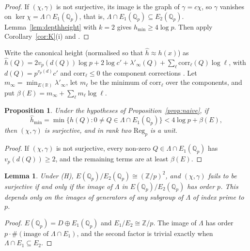 \documentclass[11pt,a4paper]{amsart}
\newcommand{\Z}{\mathbb{Z}}
\newcommand{\Qp}{\mathbb{Q}_p}
\newcommand{\Reg}{\mathrm{Reg}}
\newcommand{\Lam}{\Lambda}
\theoremstyle{plain}
\newtheorem{lemma}[theorem]{Lemma}
\newtheorem{proposition}[theorem]{Proposition}
\theoremstyle{definition}
\theoremstyle{remark}
\begin{document}
\begin{proof}
If $(\chi,\gamma)$ is not surjective, its image is the graph of $\gamma=c\chi$, so $\gamma$ vanishes on $\ker\chi=\Lam\cap E_1(\Qp)$, that is, $\Lam\cap E_1(\Qp)\subseteq E_2(\Qp)$. Lemma~\ref{lem:depthheight} with $k=2$ gives $h_{\min}\ge4\log p$. Then apply Corollary~\ref{cor:K}(i) and \cite[Cor.~6.6]{P1}.
\end{proof}

Write the canonical height (normalised so that $\hat h\approx h(x)$) as $\hat h(Q)=2v_p(d(Q))\log p+2\log c'+\lambda'_\infty(Q)+\sum_{\ell}\mathrm{corr}_\ell(Q)\log\ell$, with $d(Q)=p^{v_p(d)}c'$ and $\mathrm{corr}_\ell\le0$ the component corrections \cite{SilH}. Let $m_\infty=\min_{E(\mathbb R)}\lambda'_\infty$, let $m_\ell$ be the minimum of $\mathrm{corr}_\ell$ over the components, and put $\beta(E)=m_\infty+\sum_\ell m_\ell\log\ell$.

\begin{proposition}\label{prop:canonical}
Under the hypotheses of Proposition~\ref{prop:naive}, if
\[
\hat h_{\min}=\min\{\hat h(Q):0\ne Q\in\Lam\cap E_1(\Qp)\}<4\log p+\beta(E),
\]
then $(\chi,\gamma)$ is surjective, and in rank two $\Reg_p$ is a unit.
\end{proposition}

\begin{proof}
If $(\chi,\gamma)$ is not surjective, every non-zero $Q\in\Lam\cap E_1(\Qp)$ has $v_p(d(Q))\ge2$, and the remaining terms are at least $\beta(E)$.
\end{proof}

\begin{lemma}\label{lem:imageE2}
Under \textup{(H)}, $E(\Qp)/E_2(\Qp)\cong(\Z/p)^2$, and $(\chi,\gamma)$ fails to be surjective if and only if the image of $\Lam$ in $E(\Qp)/E_2(\Qp)$ has order $p$. This depends only on the images of generators of any subgroup of $\Lam$ of index prime to $p$.
\end{lemma}

\begin{proof}
$E(\Qp)=D\oplus E_1(\Qp)$ and $E_1/E_2\cong\Z/p$. The image of $\Lam$ has order $p\cdot\#(\text{image of }\Lam\cap E_1)$, and the second factor is trivial exactly when $\Lam\cap E_1\subseteq E_2$.
\end{proof}
\end{document}
